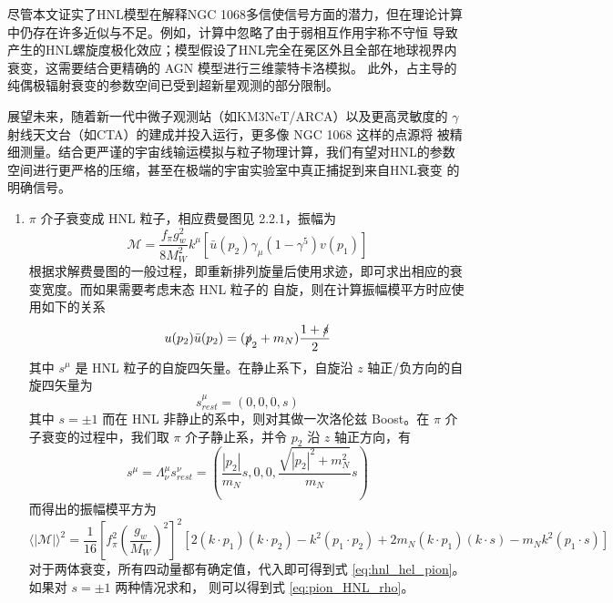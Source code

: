\documentclass[printMode=false, declarePage=false]{ecnuthesis}
\begin{document}
尽管本文证实了HNL模型在解释NGC 1068多信使信号方面的潜力，但在理论计算中仍存在许多近似与不足。例如，计算中忽略了由于弱相互作用宇称不守恒
导致产生的HNL螺旋度极化效应；模型假设了HNL完全在冕区外且全部在地球视界内衰变，这需要结合更精确的 AGN 模型进行三维蒙特卡洛模拟。
此外，占主导的纯偶极辐射衰变的参数空间已受到超新星观测的部分限制。

展望未来，随着新一代中微子观测站（如KM3NeT/ARCA）以及更高灵敏度的 $\gamma$ 射线天文台（如CTA）的建成并投入运行，更多像 NGC 1068 这样的点源将
被精细测量。结合更严谨的宇宙线输运模拟与粒子物理计算，我们有望对HNL的参数空间进行更严格的压缩，甚至在极端的宇宙实验室中真正捕捉到来自HNL衰变
的明确信号。


\backmatter


\PrintReference

\begin{appendix}
  \setcounter{equation}{0}
  \renewcommand{\theequation}{A.\arabic{equation}}
  \renewcommand{\labelenumi}{(\arabic{enumi})}
  \begin{enumerate}
    \item $\pi$ 介子衰变成 HNL 粒子，相应费曼图见 2.2.1，振幅为
          \begin{equation}
            \mathcal{M} = \frac{f_\pi g_w^2}{8 M_W^2} k^\mu [\bar{u}(p_2) \gamma_\mu (1 - \gamma^5) v(p_1)]
          \end{equation}
          根据求解费曼图的一般过程，即重新排列旋量后使用求迹，即可求出相应的衰变宽度。而如果需要考虑末态 HNL 粒子的
          自旋，则在计算振幅模平方时应使用如下的关系
          \begin{equation}
            u(p_2) \bar{u}(p_2) = (\slashed{p}_2 + m_N) \frac{1 + \slashed{s}}{2}
          \end{equation}
          其中 $s^\mu$ 是 HNL 粒子的自旋四矢量。在静止系下，自旋沿 $z$ 轴正/负方向的自旋四矢量为
          \begin{equation}
            s_{rest}^\mu = (0, 0, 0, s) \label{eq:s_rest}
          \end{equation}
          其中 $s=\pm 1$ 而在 HNL 非静止的系中，则对其做一次洛伦兹 Boost。在 $\pi$ 介子衰变的过程中，我们取 $\pi$
          介子静止系，并令 $p_2$ 沿 $z$ 轴正方向，有
          \begin{equation}
            s^\mu = \Lambda^\mu_\nu s_{rest}^\nu = \left(\frac{|p_2|}{m_N} s, 0, 0, \frac{\sqrt{|p_2|^2 + m_N^2}}{m_N} s\right)
          \end{equation}
          而得出的振幅模平方为
          \begin{equation}
            \langle |\mathcal{M}| \rangle^2 = \frac{1}{16} \left[ f_\pi^2 \left( \frac{g_w}{M_W} \right)^2 \right]^2 [ 2 (k \cdot p_1) (k \cdot p_2) - k^2 (p_1 \cdot p_2) + 2 m_N (k \cdot p_1) (k \cdot s) - m_N k^2 (p_1 \cdot s) ]
          \end{equation}
          对于两体衰变，所有四动量都有确定值，代入即可得到式 \ref{eq:hnl_hel_pion}。如果对 $s=\pm 1$ 两种情况求和，
          则可以得到式 \ref{eq:pion_HNL_rho}。
          

\end{enumerate}
\end{appendix}
\end{document}
